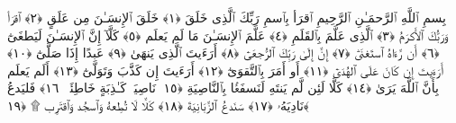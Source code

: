 
  
    
  
    
    

\nopagebreak
  بِسمِ ٱللَّهِ ٱلرَّحمَـٰنِ ٱلرَّحِيمِ
  ٱقرَأ بِٱسمِ رَبِّكَ ٱلَّذِى خَلَقَ ﴿١﴾
 خَلَقَ ٱلإِنسَـٰنَ مِن عَلَقٍ ﴿٢﴾
 ٱقرَأ وَرَبُّكَ ٱلأَكرَمُ ﴿٣﴾
 ٱلَّذِى عَلَّمَ بِٱلقَلَمِ ﴿٤﴾
 عَلَّمَ ٱلإِنسَـٰنَ مَا لَم يَعلَم ﴿٥﴾
 كَلَّآ إِنَّ ٱلإِنسَـٰنَ لَيَطغَىٰٓ ﴿٦﴾
 أَن رَّءَاهُ ٱستَغنَىٰٓ ﴿٧﴾
 إِنَّ إِلَىٰ رَبِّكَ ٱلرُّجعَىٰٓ ﴿٨﴾
 أَرَءَيتَ ٱلَّذِى يَنهَىٰ ﴿٩﴾
 عَبدًا إِذَا صَلَّىٰٓ ﴿١٠﴾
 أَرَءَيتَ إِن كَانَ عَلَى ٱلهُدَىٰٓ ﴿١١﴾
 أَو أَمَرَ بِٱلتَّقوَىٰٓ ﴿١٢﴾
 أَرَءَيتَ إِن كَذَّبَ وَتَوَلَّىٰٓ ﴿١٣﴾
 أَلَم يَعلَم بِأَنَّ ٱللَّهَ يَرَىٰ ﴿١٤﴾
 كَلَّا لَئِن لَّم يَنتَهِ لَنَسفَعًۢا بِٱلنَّاصِيَةِ ﴿١٥﴾
 نَاصِيَةٍۢ كَـٰذِبَةٍ خَاطِئَةٍۢ ﴿١٦﴾
 فَليَدعُ نَادِيَهُۥ ﴿١٧﴾
 سَنَدعُ ٱلزَّبَانِيَةَ ﴿١٨﴾
 كَلَّا لَا تُطِعهُ وَٱسجُد وَٱقتَرِب ۩ ﴿١٩﴾
 
